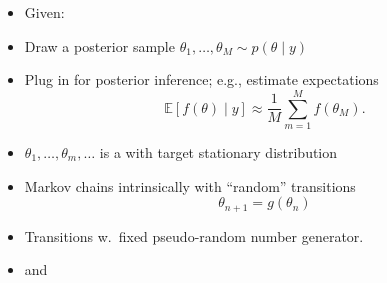 \documentclass[10pt]{report}
\newcommand{\drw}[2]{#1_{#2}}
\begin{document}
\begin{itemize}
\item Given:
\item Draw a posterior sample $\drw{\theta}{1},\ldots,\drw{\theta}{M}
  \sim p(\theta \mid y)$
\item Plug in for posterior inference; e.g., estimate expectations
  $$\mathbb{E}[f(\theta) \mid y] \approx \frac{1}{M} \sum_{m=1}^M f(\drw{\theta}{M}).$$
\end{itemize}

\begin{itemize}
\item $\drw{\theta}{1}, \ldots, \drw{\theta}{m}, \ldots$ is a
  with target stationary distribution
\item Markov chains intrinsically  with ``random'' transitions
  $$\drw{\theta}{n + 1} = g(\drw{\theta}{n})$$
\item Transitions  w.\ fixed
  pseudo-random number generator.
\vfill
\item {} and 
  \vfill
\end{itemize}
\end{document}

